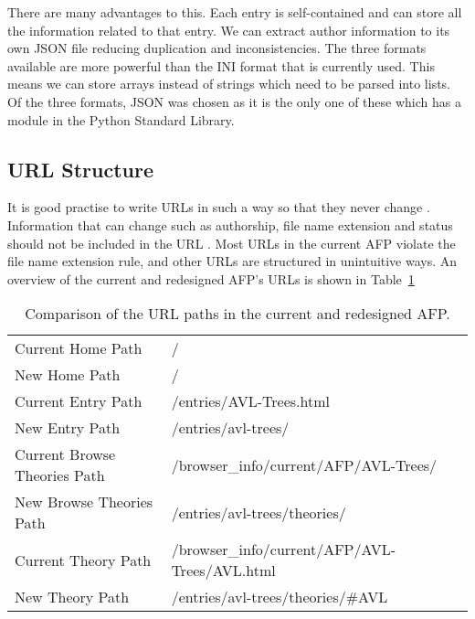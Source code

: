 \documentclass[bsc,frontabs,oneside,singlespacing,parskip,deptreport,logo]{infthesis}
\begin{document}
There are many advantages to this. Each entry is self-contained and can store all the information related to that entry. We can extract author information to its own JSON file reducing duplication and inconsistencies. The three formats available are more powerful than the INI format that is currently used. This means we can store arrays instead of strings which need to be parsed into lists. Of the three formats, JSON was chosen as it is the only one of these which has a module in the Python Standard Library.

\cbstart
\subsection{URL Structure}

It is good practise to write URLs in such a way so that they never change \cite{burners1998cool}. Information that can change such as authorship, file name extension and status should not be included in the URL \cite{burners1998cool}. Most URLs in the current AFP violate the file name extension rule, and other URLs are structured in unintuitive ways. An overview of the current and redesigned AFP's URLs is shown in Table~\ref{afp-url-path}

\begin{table}[h]
\centering
\begin{tabular}{|ll|}
\hline
Current Home Path               & /                                             \\ 
New Home Path            & /                                             \\ \hline
Current Entry Path              & /entries/AVL-Trees.html                       \\ 
New Entry Path           & /entries/avl-trees/                           \\ \hline
Current Browse Theories Path    & /browser\_info/current/AFP/AVL-Trees/         \\ 
New Browse Theories Path & /entries/avl-trees/theories/                  \\ \hline
Current Theory Path             & /browser\_info/current/AFP/AVL-Trees/AVL.html \\ 
New Theory Path          & /entries/avl-trees/theories/\#AVL             \\ \hline
\end{tabular}
\caption{Comparison of the URL paths in the current and redesigned AFP. }
\label{afp-url-path}
\end{table}
\end{document}
